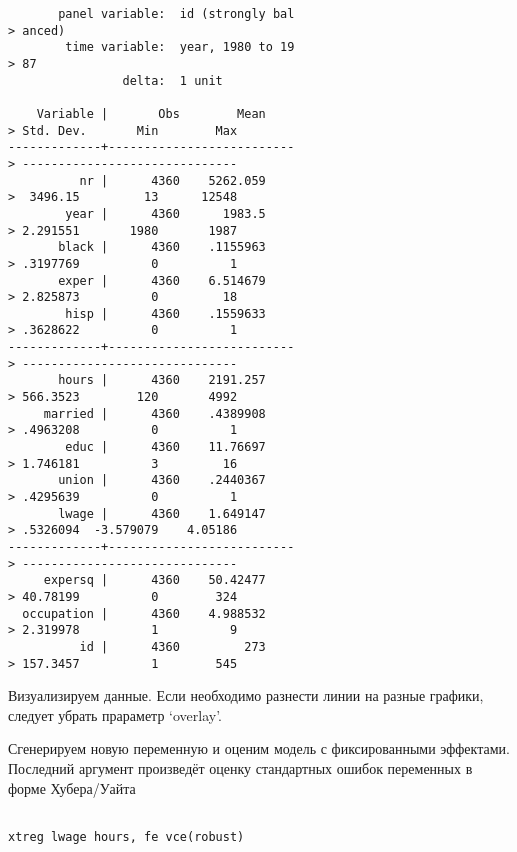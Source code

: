 \documentclass[]{article}
\begin{document}
\begin{verbatim}
       panel variable:  id (strongly bal
> anced)
        time variable:  year, 1980 to 19
> 87
                delta:  1 unit

    Variable |       Obs        Mean    
> Std. Dev.       Min        Max
-------------+--------------------------
> ------------------------------
          nr |      4360    5262.059    
>  3496.15         13      12548
        year |      4360      1983.5    
> 2.291551       1980       1987
       black |      4360    .1155963    
> .3197769          0          1
       exper |      4360    6.514679    
> 2.825873          0         18
        hisp |      4360    .1559633    
> .3628622          0          1
-------------+--------------------------
> ------------------------------
       hours |      4360    2191.257    
> 566.3523        120       4992
     married |      4360    .4389908    
> .4963208          0          1
        educ |      4360    11.76697    
> 1.746181          3         16
       union |      4360    .2440367    
> .4295639          0          1
       lwage |      4360    1.649147    
> .5326094  -3.579079    4.05186
-------------+--------------------------
> ------------------------------
     expersq |      4360    50.42477    
> 40.78199          0        324
  occupation |      4360    4.988532    
> 2.319978          1          9
          id |      4360         273    
> 157.3457          1        545
\end{verbatim}

Визуализируем данные. Если необходимо разнести линии на разные графики,
следует убрать прараметр `overlay'.

Сгенерируем новую переменную и оценим модель с фиксированными эффектами.
Последний аргумент произведёт оценку стандартных ошибок переменных в
форме Хубера/Уайта

\begin{verbatim}

xtreg lwage hours, fe vce(robust)
\end{verbatim}
\end{document}
